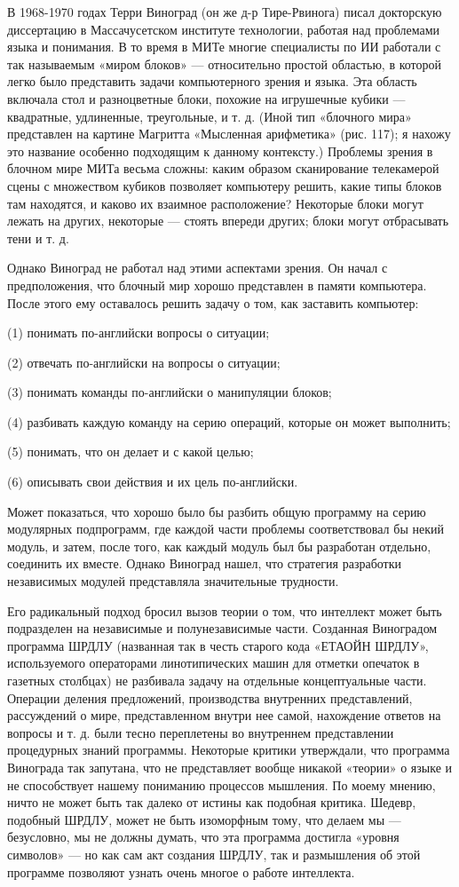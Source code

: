 \documentclass[../main.tex]{subfiles}
\begin{document}
В 1968-1970 годах Терри Виноград (он же д-р Тире-Рвинога) писал докторскую диссертацию в Массачусетском институте технологии, работая над проблемами языка и понимания. В то время в МИТе многие специалисты по ИИ работали с так называемым «миром блоков» --- относительно простой областью, в которой легко было представить задачи компьютерного зрения и языка. Эта область включала стол и разноцветные блоки, похожие на игрушечные кубики --- квадратные, удлиненные, треугольные, и т. д. (Иной тип «блочного мира» представлен на картине Магритта «Мысленная арифметика» (рис. 117); я нахожу это название особенно подходящим к данному контексту.) Проблемы зрения в блочном мире МИТа весьма сложны: каким образом сканирование телекамерой сцены с множеством кубиков позволяет компьютеру решить, какие типы блоков там находятся, и каково их взаимное расположение? Некоторые блоки могут лежать на других, некоторые --- стоять впереди других; блоки могут отбрасывать тени и т. д.

Однако Виноград не работал над этими аспектами зрения. Он начал с предположения, что блочный мир хорошо представлен в памяти компьютера. После этого ему оставалось решить задачу о том, как заставить компьютер:

(1) понимать по-английски вопросы о ситуации;

(2) отвечать по-английски на вопросы о ситуации;

(3) понимать команды по-английски о манипуляции блоков;

(4) разбивать каждую команду на серию операций, которые он может выполнить;

(5) понимать, что он делает и с какой целью;

(6) описывать свои действия и их цель по-английски.

Может показаться, что хорошо было бы разбить общую программу на серию модулярных подпрограмм, где каждой части проблемы соответствовал бы некий модуль, и затем, после того, как каждый модуль был бы разработан отдельно, соединить их вместе. Однако Виноград нашел, что стратегия разработки независимых модулей представляла значительные трудности.

Его радикальный подход бросил вызов теории о том, что интеллект может быть подразделен на независимые и полунезависимые части. Созданная Виноградом программа ШРДЛУ (названная так в честь старого кода «ЕТАОЙН ШРДЛУ», используемого операторами линотипических машин для отметки опечаток в газетных столбцах) не разбивала задачу на отдельные концептуальные части. Операции деления предложений, производства внутренних представлений, рассуждений о мире, представленном внутри нее самой, нахождение ответов на вопросы и т. д. были тесно переплетены во внутреннем представлении процедурных знаний программы. Некоторые критики утверждали, что программа Винограда так запутана, что не представляет вообще никакой «теории» о языке и не способствует нашему пониманию процессов мышления. По моему мнению, ничто не может быть так далеко от истины как подобная критика. Шедевр, подобный ШРДЛУ, может не быть изоморфным тому, что делаем мы --- безусловно, мы не должны думать, что эта программа достигла «уровня символов» --- но как сам акт создания ШРДЛУ, так и размышления об этой программе позволяют узнать очень многое о работе интеллекта.
\end{document}

